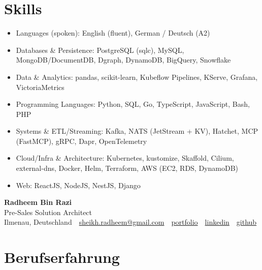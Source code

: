 \documentclass[10pt,a4paper]{resume}
\makeatletter
\newcommand{\Portfolio}{https://radheem.github.io/my-cv}
\newcommand{\PortfolioText}{portfolio}
\newcommand{\GitHub}{https://github.com/radheem}
\newcommand{\LinkedIn}{https://www.linkedin.com/in/radheem-razi}
\newcommand{\Email}{sheikh.radheem@gmail.com}
\makeatother
\begin{document}
\section{Skills}

\begin{itemize}[leftmargin=1.4em,nosep,topsep=2pt]
  \item Languages (spoken): English (fluent), German / Deutsch (A2)
  \item Databases \& Persistence: PostgreSQL (sqlc), MySQL, MongoDB/DocumentDB, Dgraph, DynamoDB, BigQuery, Snowflake
  \item Data \& Analytics: pandas, scikit-learn, Kubeflow Pipelines, KServe, Grafana, VictoriaMetrics
  \item Programming Languages: Python, SQL, Go, TypeScript, JavaScript, Bash, PHP
  \item Systems \& ETL/Streaming: Kafka, NATS (JetStream + KV), Hatchet, MCP (FastMCP), gRPC, Dapr, OpenTelemetry
  \item Cloud/Infra \& Architecture: Kubernetes, kustomize, Skaffold, Cilium, external-dns, Docker, Helm, Terraform, AWS (EC2, RDS, DynamoDB)
  \item Web: ReactJS, NodeJS, NestJS, Django
\end{itemize}

\clearpage
{}

\begin{center}
  {\huge\bfseries Radheem Bin Razi}\\[3pt]
  {\large Pre-Sales Solution Architect}\\[6pt]
  \small
  Ilmenau, Deutschland \,\textbar\,
  \href{mailto:\Email}{\Email} \,\textbar\,
  \href{\Portfolio}{\PortfolioText} \,\textbar\,
  \href{\LinkedIn}{linkedin} \,\textbar\,
  \href{\GitHub}{github}
\end{center}
\vspace{2pt}

\section{Berufserfahrung}
\end{document}
